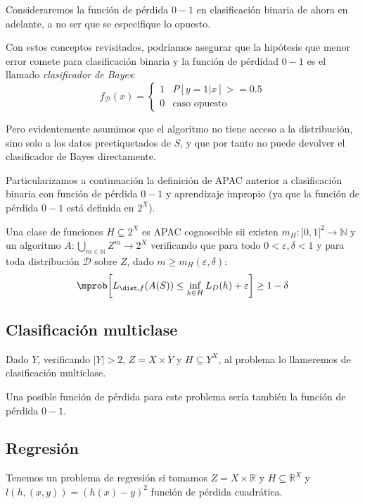 Consideraremos la función de pérdida $0-1$ en clasificación binaria de ahora en adelante, a no ser que se especifique
lo opuesto.

Con estos conceptos revisitados, podríamos asegurar que la hipótesis que menor error comete para 
clasificación binaria y la función de pérdidad $0-1$ es el llamado \textit{clasificador de Bayes}:
\[
  f_{\mathcal{D}}(x) = \left\{\begin{array}{ll}
                              1 & P [y = 1 |x] >= 0.5\\
                              0 & \textrm{caso opuesto}
                              \end{array}\right.
\]

Pero evidentemente asumimos que el algoritmo no tiene acceso a la distribución, sino solo a los datos 
preetiquetados de $S$, y que por tanto no puede devolver el clasificador de Bayes directamente.

Particularizamos a continuación la definición de APAC anterior a clasificación binaria
con función de pérdida $0-1$ y aprendizaje impropio (ya que la función de pérdida $0-1$ está definida 
en $2^X$).

\begin{definition}
Una clase de funciones $H \subseteq 2^X$ es APAC cognoscible sii existen 
$m_{H} : ]0,1[^2\rightarrow \mathbb{N}$ y un algoritmo $A: \underset{m\in \mathbb{N}}{\bigcup} Z^m \rightarrow 2^X$ verificando que para todo
$0 < \varepsilon, \delta < 1$ y para toda distribución $\mathcal{D}$ sobre $Z$, dado $m \ge m_H(\varepsilon, \delta)$:
\[
  \mprob \bigg[L_{\dist,f}(A(S)) \le \inf_{h\in H} L_D(h) + \varepsilon \bigg] \ge 1-\delta 
\]
\end{definition}

\subsection{Clasificación multiclase}
Dado $Y$, verificando $|Y| > 2$, $Z=X\times Y$ y $H\subseteq Y^X$, al problema lo llameremos de 
clasificación multiclase. 

Una posible función de pérdida para este problema sería también la función de pérdida $0-1$.

\subsection{Regresión}
Tenemos un problema de regresión si tomamos $Z=X \times \mathbb{R}$ y $H\subseteq \mathbb{R}^X$
y $l(h,(x,y)) = (h(x)-y)^2$ función de pérdida cuadrática.

